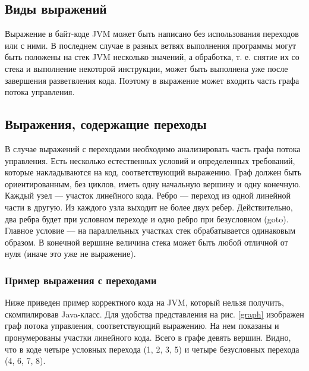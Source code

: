 


\subsection{Виды выражений}
Выражение в байт-коде JVM может быть написано без использования переходов или с ними. В последнем случае в разных ветвях выполнения программы могут быть положены на стек JVM несколько значений, а обработка, т. е. снятие их со стека и выполнение некоторой инструкции, может быть выполнена уже после завершения разветвления кода. Поэтому в выражение может входить часть графа потока управления.

\subsection{Выражения, содержащие переходы}
В случае выражений с переходами необходимо анализировать часть графа потока управления. Есть несколько естественных условий и определенных требований, которые накладываются на код, соответствующий выражению. Граф должен быть ориентированным, без циклов, иметь одну начальную вершину и одну конечную. Каждый узел --- участок линейного кода. Ребро --- переход из одной линейной части в другую. Из каждого узла выходит не более двух ребер. Действительно, два ребра будет при условном переходе и одно ребро при безусловном (goto). Главное условие --- на параллельных участках стек обрабатывается одинаковым образом. В конечной вершине величина стека может быть любой отличной от нуля (иначе это уже не выражение).

\subsubsection*{Пример выражения с переходами}
Ниже приведен пример корректного кода на JVM, который нельзя получить, скомпилировав Java-класс. Для удобства представления на рис. \ref{graph} изображен граф потока управления, соответствующий выражению. На нем показаны и пронумерованы участки линейного кода. Всего в графе девять вершин. Видно, что в коде четыре условных перехода (1, 2, 3, 5) и четыре безусловных перехода (4, 6, 7, 8). 

